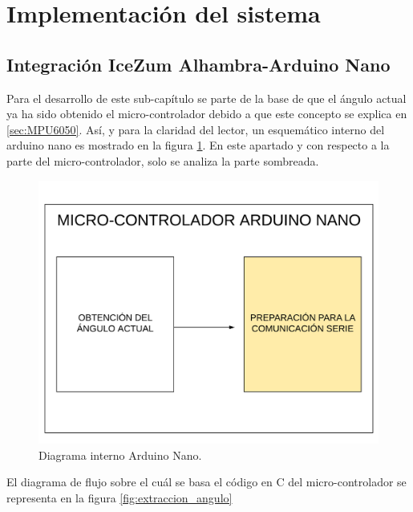 \section{Implementación del sistema}
\subsection{Integración IceZum Alhambra-Arduino Nano}\label{sec:Integracion}
Para el desarrollo de este sub-capítulo se parte de la base de que el ángulo actual ya ha sido obtenido el micro-controlador debido a que este concepto se explica en \ref{sec:MPU6050}. Así, y para la claridad del lector, un esquemático interno del arduino nano es mostrado en la figura \ref{fig:coexistencia3}. En este apartado y con respecto a la parte del micro-controlador, solo se analiza la parte sombreada.  

\begin{figure}[H]
	\center
	\includegraphics[trim = 0mm 0mm 0mm 0mm, clip,scale=0.3]{imagenes/Balancing_robot/coexistencia3.pdf}
	\caption{Diagrama interno Arduino Nano.}
	\label{fig:coexistencia3}
\end{figure}

El diagrama de flujo sobre el cuál se basa el código en C del micro-controlador se representa en la figura \ref{fig:extraccion_angulo}

